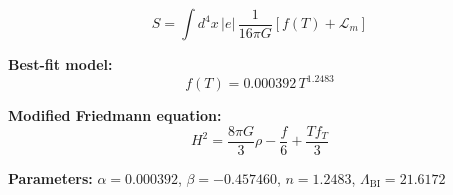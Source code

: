 
\begin{equation}
  S = \int d^4x \, |e| \, \frac{1}{16\pi G} \left[ f(T) + \mathcal{L}_m \right]
\end{equation}

\textbf{Best-fit model:}
\begin{equation}
  f(T) = 0.000392 \, T^{1.2483}
\end{equation}

\textbf{Modified Friedmann equation:}
\begin{equation}
  H^2 = \frac{8\pi G}{3} \rho - \frac{f}{6} + \frac{T f_T}{3}
\end{equation}

\textbf{Parameters:}
$\alpha = 0.000392$, \quad
$\beta = -0.457460$, \quad
$n = 1.2483$, \quad
$\Lambda_{\text{BI}} = 21.6172$